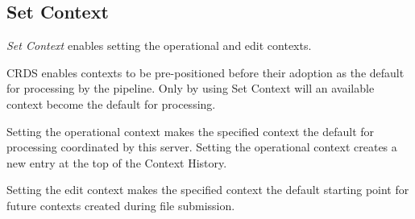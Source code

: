 \documentclass[letterpaper,10pt,english]{sphinxmanual}
\begin{document}
\subsection{Set Context}
\label{web_site_use:set-context}
\emph{Set Context} enables setting the operational and edit contexts.
\begin{figure}[htbp]
\centering

\end{figure}

CRDS enables contexts to be pre-positioned before their adoption as the default
for processing by the pipeline.  Only by using Set Context will an available
context become the default for processing.

Setting the operational context makes the specified context the default for
processing coordinated by this server.  Setting the operational context creates
a new entry at the top of the Context History.

Setting the edit context makes the specified context the default starting point
for future contexts created during file submission.
\end{document}
